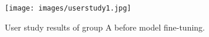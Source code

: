 \begin{figure}
\centering
\texttt{[image: images/userstudy1.jpg]}
\caption{User study results of group A before model fine-tuning.}
\label{fig:userstudy1}
\end{figure}